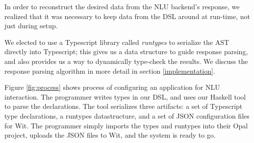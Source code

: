 \documentclass[twocolumn]{article}
\begin{document}
In order to reconstruct the desired data from the NLU backend's response, we
realized that it was necessary to keep data from the DSL around at run-time, not
just during setup.

\begin{figure*}
  \centering
  \caption{The configuration process.}
  \label{fig:process}
\end{figure*}

We elected to use a Typescript library called \emph{runtypes} to serialize the
AST directly into Typescript; this gives us a data structure to guide response
parsing, and also provides us a way to dynamically type-check the results. We
discuss the response parsing algorithm in more detail in section
\ref{implementation}.

Figure \ref{fig:process} shows process of configuring an application for NLU
interaction. The programmer writes types in our DSL, and uses our Haskell tool
to parse the declarations. The tool serializes three artifacts: a set of
Typescript type declarations, a runtypes datastructure, and a set of JSON
configuration files for Wit. The programmer simply imports the types and
runtypes into their Opal project, uploads the JSON files to Wit, and the system
is ready to go.
\end{document}
